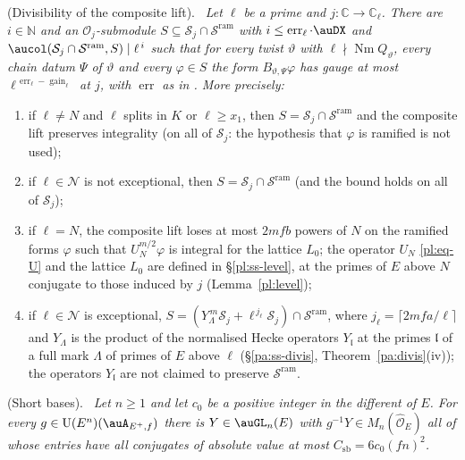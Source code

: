 \documentclass[10pt]{amsart}
\theoremstyle{definition}
\theoremstyle{remark}
\newcommand{\C}{\mathbb C}
\newcommand{\N}{\mathbb N}
\providecommand{\auNm}{\operatorname{Nm}}
\providecommand{\auO}{\mathcal O}
\providecommand{\auS}{\mathcal S}
\providecommand{\auSram}{\mathcal S^{\mathrm{ram}}}
\providecommand{\auU}{\mathrm U}
\providecommand{\auerr}{\operatorname{err}}
\providecommand{\augain}{\operatorname{gain}}
\newenvironment{quotedthm}[2]{\par\medskip\noindent\begingroup
  \textbf{#1}#2.\ \itshape\ignorespaces}{\endgroup\par\medskip}
\begin{document}
\begin{quotedthm}{\cite[Proposition~14.20]{P46}}{ (Divisibility of the composite lift)}
Let $\ell$ be a prime and $j\colon\C\to\C_\ell$. There are $i\in\N$ and an $\auO_j$-submodule
$S\subseteq\auS_j\cap\auSram$ with $i\le\auerr_\ell\cdot\auDX$ and
$\aucol(\auS_j\cap\auSram,S)\mid\ell^{\,i}$ such that for every twist $\vartheta$ with
$\ell\nmid\auNm Q_\vartheta$, every chain datum $\Psi$ of $\vartheta$ and every $\varphi\in S$ the
form $B_{\vartheta,\Psi}\varphi$ has gauge at most $\ell^{\,\auerr_\ell-\augain_\ell}$ at $j$,
with $\auerr$ as in {\cite[(45)]{P46}}. More precisely:
\begin{enumerate}
\item[(i)] if $\ell\ne N$ and $\ell$ splits in $K$ or $\ell\ge x_1$, then $S=\auS_j\cap\auSram$
and the composite lift preserves integrality (on all of $\auS_j$: the hypothesis that $\varphi$ is
ramified is not used);
\item[(ii)] if $\ell\in\mathcal N$ is not exceptional, then $S=\auS_j\cap\auSram$ (and the bound
holds on all of $\auS_j$);
\item[(iii)] if $\ell=N$, the composite lift loses at most $2mfb$ powers of $N$ on the ramified
forms $\varphi$ such that $U_N^{m/2}\varphi$ is integral for the lattice $L_0$; the operator $U_N$
\eqref{pl:eq-U} and the lattice $L_0$ are defined in \S\ref{pl:ss-level}, at the primes of $E$
above $N$ conjugate to those induced by $j$ (Lemma~\ref{pl:level});
\item[(iv)] if $\ell\in\mathcal N$ is exceptional, $S=(Y_\Lambda^{\,m}\auS_j+\ell^{\,j_\ell}\auS_j)
\cap\auSram$, where $j_\ell=\lceil2mfa/\ell\rceil$ and $Y_\Lambda$ is the product of the normalised
Hecke operators $Y_{\mathfrak l}$ at the primes $\mathfrak l$ of a full mark $\Lambda$ of primes of
$E$ above $\ell$ (\S\ref{pa:ss-divis}, Theorem~\ref{pa:divis}(iv)); the operators $Y_{\mathfrak l}$
are not claimed to preserve $\auSram$.
\end{enumerate}
\end{quotedthm}

\begin{quotedthm}{\cite[Lemma~14.21]{P46}}{ (Short bases)}
Let $n\ge1$ and let $c_0$ be a positive integer in the different of $E$. For every
$g\in\auU(E^n)(\auA_{E^+,f})$ there is $Y\in\auGL_n(E)$ with $g^{-1}Y\in M_n(\widehat{\auO}_E)$
all of whose entries have all conjugates of absolute value at most $C_{\mathrm{sb}}=6c_0(fn)^2$.
\end{quotedthm}
\end{document}
